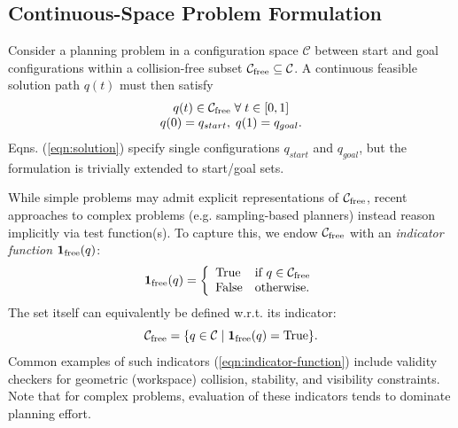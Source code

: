 \subsection{Continuous-Space Problem Formulation}
\label{subsec:single-set-formulation}

Consider a planning problem in a configuration space $\mathcal{C}$
between start and goal configurations
within a collision-free subset
$\mathcal{C}_{\mbox{\scriptsize free}} \subseteq \mathcal{C}$.
A continuous feasible solution path $q(t)$ must then satisfy
\begin{equation}
  \begin{array}{c}
  q(t) \in \mathcal{C}_{\mbox{\scriptsize free}} \;\forall\; t \in [0,1] \\
  q(0) = q_{start},\; q(1) = q_{goal} . \\
  \end{array}
  \label{eqn:solution}
\end{equation}
Eqns. (\ref{eqn:solution})
specify single configurations
$q_{start}$ and $q_{goal}$,
but the formulation is trivially extended to start/goal sets.

While simple problems may admit explicit representations of
$\mathcal{C}_{\mbox{\scriptsize free}}$,
recent approaches to complex problems
(e.g. sampling-based planners)
instead reason implicitly via test function(s).%
\cite{lavalle2006planningbook}
To capture this,
we endow $\mathcal{C}_{\mbox{\scriptsize free}}$ with an
\emph{indicator function} $\mathbf{1}_{\mbox{\scriptsize free}}(q)$:
\begin{equation}
  \mathbf{1}_{\mbox{\scriptsize free}}(q) =
    \left\{ \begin{array}{ll}
      \mbox{True} & \mbox{if } q \in \mathcal{C}_{\mbox{\scriptsize free}} \\
      \mbox{False} & \mbox{otherwise}.
    \end{array} \right.
  \label{eqn:indicator-function}
\end{equation}
The set itself can equivalently be defined w.r.t. its indicator:
\begin{equation}
  \mathcal{C}_{\mbox{\scriptsize free}} =
  \{ q \in \mathcal{C} \;|\; \mathbf{1}_{\mbox{\scriptsize free}}(q) = \mbox{True} \} .
\end{equation}
Common examples of such indicators
(\ref{eqn:indicator-function})
include validity checkers for
geometric (workspace) collision,
stability, and visibility constraints.
Note that for complex problems,
evaluation of these indicators 
tends to dominate planning effort.

